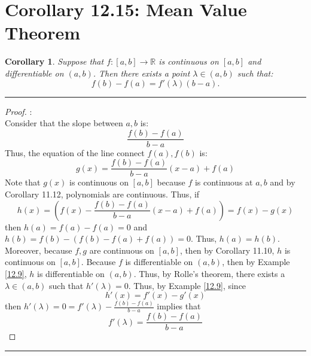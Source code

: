 \documentclass[openany, amssymb, psamsfonts]{amsart}
\newcommand{\bbR}{\mathbb{R}}
\newtheorem{cor}{Corollary}[section]
\theoremstyle{definition}
\numberwithin{equation}{section}
\begin{document}
\section*{Corollary 12.15: Mean Value Theorem}
\begin{cor}
	\label{12.15}
	Suppose that $f\colon [a, b] \to \bbR$ is continuous on $[a, b]$ and differentiable on $(a, b)$. Then there exists a point $\lambda \in (a, b)$ such that:
	\[
		f(b) - f(a) = f'(\lambda) (b - a).
	\]
\end{cor}
\vspace{4pt}     \hrule   \vspace{4pt} \begin{proof}:\\
Consider that the slope between $a,b$ is:
\[\frac{f(b) - f(a)}{b-a}\] Thus, the equation of the line connect $f(a), f(b)$ is:
\[g(x) = \frac{f(b)-f(a)}{b-a}(x-a) + f(a)\] Note that $g(x)$ is continuous on $[a,b]$ because $f$ is continuous at $a,b$ and by Corollary 11.12, polynomials are continuous. Thus, if \[h(x) = (f(x) - \frac{f(b)-f(a)}{b-a}(x-a) + f(a)) = f(x) - g(x)\] then $h(a) = f(a) - f(a) = 0$ and $h(b) = f(b) - (f(b) - f(a) + f(a)) = 0$. Thus, $h(a) = h(b)$. Moreover, because $f,g$ are continuous on $[a,b]$, then by Corollary 11.10, $h$ is continuous on $[a,b]$. Because $f$ is differentiable on $(a,b)$, then by Example \ref{12.9}, $h$ is differentiable on $(a,b)$. Thus, by Rolle's theorem, there exists a $\lambda \in (a,b)$ such that $h'(\lambda) = 0$. Thus, by Example \ref{12.9}, since \[h'(x) = f'(x) - g'(x)\] then $h'(\lambda) = 0 = f'(\lambda) - \frac{f(b) - f(a)}{b-a}$ implies that \[f'(\lambda) = \frac{f(b) - f(a)}{b-a}\]
\end{proof}\vspace{4pt}     \hrule   \vspace{4pt}
\end{document}
